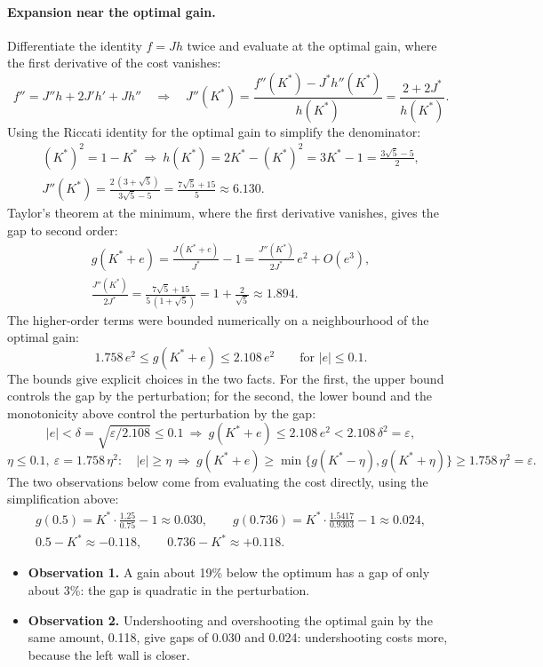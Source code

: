 \documentclass[11pt]{article}
\begin{document}
\paragraph{Expansion near the optimal gain.} Differentiate the identity $f = J h$ twice and evaluate
at the optimal gain, where the first derivative of the cost vanishes:
\[
  f'' = J'' h + 2 J' h' + J h''
  \quad\Longrightarrow\quad
  J''(K^*) = \frac{f''(K^*) - J^* h''(K^*)}{h(K^*)} = \frac{2 + 2J^*}{h(K^*)} .
\]
Using the Riccati identity for the optimal gain to simplify the denominator:
\begin{gather*}
  (K^*)^2 = 1 - K^* \ \Longrightarrow\ h(K^*) = 2K^* - (K^*)^2 = 3K^* - 1 = \frac{3\sqrt{5} - 5}{2}, \\
  J''(K^*) = \frac{2\,(3 + \sqrt{5})}{3\sqrt{5} - 5} = \frac{7\sqrt{5} + 15}{5} \approx 6.130 .
\end{gather*}
Taylor's theorem at the minimum, where the first derivative vanishes, gives the gap to second order:
\begin{gather*}
  g(K^* + e) = \frac{J(K^* + e)}{J^*} - 1 = \frac{J''(K^*)}{2J^*}\, e^2 + O(e^3), \\
  \frac{J''(K^*)}{2J^*} = \frac{7\sqrt{5} + 15}{5\,(1 + \sqrt{5})} = 1 + \frac{2}{\sqrt{5}} \approx 1.894 .
\end{gather*}
The higher-order terms were bounded numerically on a neighbourhood of the optimal gain:
\[
  1.758\, e^2 \le g(K^* + e) \le 2.108\, e^2 \qquad \text{for } |e| \le 0.1 .
\]
The bounds give explicit choices in the two facts. For the first, the upper bound controls the gap
by the perturbation; for the second, the lower bound and the monotonicity above control the
perturbation by the gap:
\[
  |e| < \delta = \sqrt{\varepsilon / 2.108} \le 0.1
  \ \Longrightarrow\ g(K^* + e) \le 2.108\, e^2 < 2.108\, \delta^2 = \varepsilon ,
\]
\[
  \eta \le 0.1, \ \varepsilon = 1.758\, \eta^2: \quad
  |e| \ge \eta \ \Longrightarrow\ g(K^* + e) \ge \min\big\{ g(K^* - \eta), g(K^* + \eta) \big\}
  \ge 1.758\, \eta^2 = \varepsilon .
\]
The two observations below come from evaluating the cost directly, using the simplification above:
\begin{gather*}
  g(0.5) = K^* \cdot \frac{1.25}{0.75} - 1 \approx 0.030, \qquad
  g(0.736) = K^* \cdot \frac{1.5417}{0.9303} - 1 \approx 0.024, \\
  0.5 - K^* \approx -0.118, \qquad 0.736 - K^* \approx +0.118 .
\end{gather*}
\begin{itemize}
  \item \textbf{Observation 1.} A gain about 19\% below the optimum has a gap of only about 3\%: the
    gap is quadratic in the perturbation.
  \item \textbf{Observation 2.} Undershooting and overshooting the optimal gain by the same amount,
    0.118, give gaps of 0.030 and 0.024: undershooting costs more, because the left wall is closer.
\end{itemize}
\end{document}
